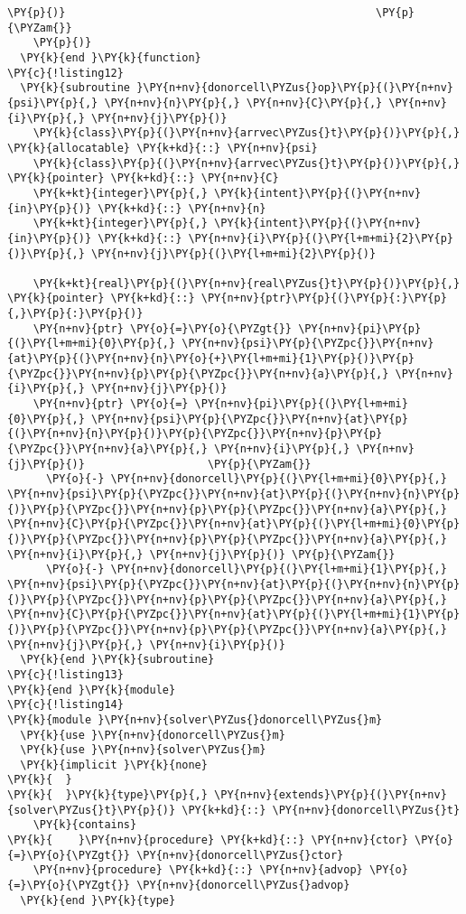 \begin{Verbatim}[commandchars=\\\{\}]
      \PY{p}{)}                                                \PY{p}{\PYZam{}}
    \PY{p}{)}
  \PY{k}{end }\PY{k}{function}
\PY{c}{!listing12}
  \PY{k}{subroutine }\PY{n+nv}{donorcell\PYZus{}op}\PY{p}{(}\PY{n+nv}{psi}\PY{p}{,} \PY{n+nv}{n}\PY{p}{,} \PY{n+nv}{C}\PY{p}{,} \PY{n+nv}{i}\PY{p}{,} \PY{n+nv}{j}\PY{p}{)}  
    \PY{k}{class}\PY{p}{(}\PY{n+nv}{arrvec\PYZus{}t}\PY{p}{)}\PY{p}{,} \PY{k}{allocatable} \PY{k+kd}{::} \PY{n+nv}{psi}
    \PY{k}{class}\PY{p}{(}\PY{n+nv}{arrvec\PYZus{}t}\PY{p}{)}\PY{p}{,} \PY{k}{pointer} \PY{k+kd}{::} \PY{n+nv}{C}
    \PY{k+kt}{integer}\PY{p}{,} \PY{k}{intent}\PY{p}{(}\PY{n+nv}{in}\PY{p}{)} \PY{k+kd}{::} \PY{n+nv}{n}
    \PY{k+kt}{integer}\PY{p}{,} \PY{k}{intent}\PY{p}{(}\PY{n+nv}{in}\PY{p}{)} \PY{k+kd}{::} \PY{n+nv}{i}\PY{p}{(}\PY{l+m+mi}{2}\PY{p}{)}\PY{p}{,} \PY{n+nv}{j}\PY{p}{(}\PY{l+m+mi}{2}\PY{p}{)} 
    
    \PY{k+kt}{real}\PY{p}{(}\PY{n+nv}{real\PYZus{}t}\PY{p}{)}\PY{p}{,} \PY{k}{pointer} \PY{k+kd}{::} \PY{n+nv}{ptr}\PY{p}{(}\PY{p}{:}\PY{p}{,}\PY{p}{:}\PY{p}{)}
    \PY{n+nv}{ptr} \PY{o}{=}\PY{o}{\PYZgt{}} \PY{n+nv}{pi}\PY{p}{(}\PY{l+m+mi}{0}\PY{p}{,} \PY{n+nv}{psi}\PY{p}{\PYZpc{}}\PY{n+nv}{at}\PY{p}{(}\PY{n+nv}{n}\PY{o}{+}\PY{l+m+mi}{1}\PY{p}{)}\PY{p}{\PYZpc{}}\PY{n+nv}{p}\PY{p}{\PYZpc{}}\PY{n+nv}{a}\PY{p}{,} \PY{n+nv}{i}\PY{p}{,} \PY{n+nv}{j}\PY{p}{)}
    \PY{n+nv}{ptr} \PY{o}{=} \PY{n+nv}{pi}\PY{p}{(}\PY{l+m+mi}{0}\PY{p}{,} \PY{n+nv}{psi}\PY{p}{\PYZpc{}}\PY{n+nv}{at}\PY{p}{(}\PY{n+nv}{n}\PY{p}{)}\PY{p}{\PYZpc{}}\PY{n+nv}{p}\PY{p}{\PYZpc{}}\PY{n+nv}{a}\PY{p}{,} \PY{n+nv}{i}\PY{p}{,} \PY{n+nv}{j}\PY{p}{)}                   \PY{p}{\PYZam{}}
      \PY{o}{-} \PY{n+nv}{donorcell}\PY{p}{(}\PY{l+m+mi}{0}\PY{p}{,} \PY{n+nv}{psi}\PY{p}{\PYZpc{}}\PY{n+nv}{at}\PY{p}{(}\PY{n+nv}{n}\PY{p}{)}\PY{p}{\PYZpc{}}\PY{n+nv}{p}\PY{p}{\PYZpc{}}\PY{n+nv}{a}\PY{p}{,} \PY{n+nv}{C}\PY{p}{\PYZpc{}}\PY{n+nv}{at}\PY{p}{(}\PY{l+m+mi}{0}\PY{p}{)}\PY{p}{\PYZpc{}}\PY{n+nv}{p}\PY{p}{\PYZpc{}}\PY{n+nv}{a}\PY{p}{,} \PY{n+nv}{i}\PY{p}{,} \PY{n+nv}{j}\PY{p}{)} \PY{p}{\PYZam{}}
      \PY{o}{-} \PY{n+nv}{donorcell}\PY{p}{(}\PY{l+m+mi}{1}\PY{p}{,} \PY{n+nv}{psi}\PY{p}{\PYZpc{}}\PY{n+nv}{at}\PY{p}{(}\PY{n+nv}{n}\PY{p}{)}\PY{p}{\PYZpc{}}\PY{n+nv}{p}\PY{p}{\PYZpc{}}\PY{n+nv}{a}\PY{p}{,} \PY{n+nv}{C}\PY{p}{\PYZpc{}}\PY{n+nv}{at}\PY{p}{(}\PY{l+m+mi}{1}\PY{p}{)}\PY{p}{\PYZpc{}}\PY{n+nv}{p}\PY{p}{\PYZpc{}}\PY{n+nv}{a}\PY{p}{,} \PY{n+nv}{j}\PY{p}{,} \PY{n+nv}{i}\PY{p}{)}
  \PY{k}{end }\PY{k}{subroutine}
\PY{c}{!listing13}
\PY{k}{end }\PY{k}{module}
\PY{c}{!listing14}
\PY{k}{module }\PY{n+nv}{solver\PYZus{}donorcell\PYZus{}m}
  \PY{k}{use }\PY{n+nv}{donorcell\PYZus{}m}
  \PY{k}{use }\PY{n+nv}{solver\PYZus{}m}
  \PY{k}{implicit }\PY{k}{none}
\PY{k}{  }
\PY{k}{  }\PY{k}{type}\PY{p}{,} \PY{n+nv}{extends}\PY{p}{(}\PY{n+nv}{solver\PYZus{}t}\PY{p}{)} \PY{k+kd}{::} \PY{n+nv}{donorcell\PYZus{}t}
    \PY{k}{contains}
\PY{k}{    }\PY{n+nv}{procedure} \PY{k+kd}{::} \PY{n+nv}{ctor} \PY{o}{=}\PY{o}{\PYZgt{}} \PY{n+nv}{donorcell\PYZus{}ctor}
    \PY{n+nv}{procedure} \PY{k+kd}{::} \PY{n+nv}{advop} \PY{o}{=}\PY{o}{\PYZgt{}} \PY{n+nv}{donorcell\PYZus{}advop}
  \PY{k}{end }\PY{k}{type}


\end{Verbatim}
